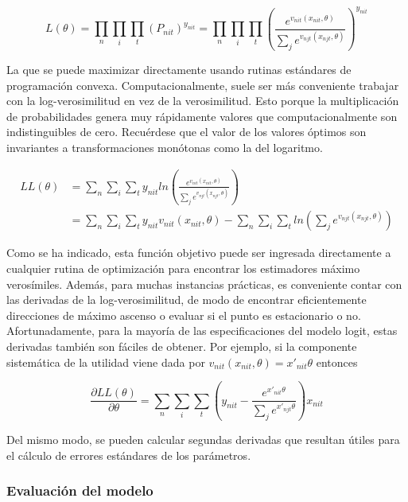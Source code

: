 \documentclass[
]{book}
\begin{document}
\begin{equation}
L(\theta) = \prod_n\prod_i\prod_t (P_{nit})^{y_{nit}} =  \prod_n\prod_i\prod_t \left(\frac{e^{v_{nit}(x_{nit},\theta)}}{\sum_j e^{v_{njt}(x_{njt},\theta)}}\right)^{y_{nit}}
\label{eq:likelihood}
\end{equation}

La que se puede maximizar directamente usando rutinas estándares de programación convexa. Computacionalmente, suele ser más conveniente trabajar con la log-verosimilitud en vez de la verosimilitud. Esto porque la multiplicación de probabilidades genera muy rápidamente valores que computacionalmente son indistinguibles de cero. Recuérdese que el valor de los valores óptimos son invariantes a transformaciones monótonas como la del logaritmo.

\begin{equation}
\begin{aligned}
LL(\theta) &= \sum_n\sum_i\sum_t y_{nit} ln \left(\frac{e^{v_{nit}(x_{nit},\theta)}}{\sum_j e^{v_{njt}(x_{njt},\theta)}}\right)\\
&= \sum_n\sum_i\sum_t y_{nit}v_{nit}(x_{nit},\theta) - \sum_n\sum_i\sum_t ln \left(\sum_j e^{v_{njt}(x_{njt},\theta)}\right)
\end{aligned}
\label{eq:loglikelihood}
\end{equation}

Como se ha indicado, esta función objetivo puede ser ingresada directamente a cualquier rutina de optimización para encontrar los estimadores máximo verosímiles. Además, para muchas instancias prácticas, es conveniente contar con las derivadas de la log-verosimilitud, de modo de encontrar eficientemente direcciones de máximo ascenso o evaluar si el punto es estacionario o no. Afortunadamente, para la mayoría de las especificaciones del modelo logit, estas derivadas también son fáciles de obtener. Por ejemplo, si la componente sistemática de la utilidad viene dada por \(v_{nit}(x_{nit}, \theta) = x'_{nit}\theta\) entonces

\begin{equation}
\frac{\partial LL(\theta)}{\partial \theta} = \sum_n\sum_i\sum_t \left(y_{nit} - \frac{e^{x'_{nit}\theta}}{\sum_j e^{x'_{njt}\theta}}\right)x_{nit}
\label{eq:gradient}
\end{equation}

Del mismo modo, se pueden calcular segundas derivadas que resultan útiles para el cálculo de errores estándares de los parámetros.

\hypertarget{evaluaciuxf3n-del-modelo}{%
\subsubsection*{Evaluación del modelo}\label{evaluaciuxf3n-del-modelo}}
\end{document}
